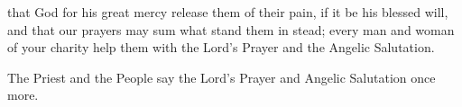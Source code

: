 that God for his great mercy release them of their pain, if it be his blessed will, and that our prayers may sum what stand them in stead; every man and woman of your charity help them with the Lord's Prayer and the Angelic Salutation.
\begin{rubric}
    The Priest and the People say the Lord's Prayer and Angelic Salutation once more.
\end{rubric}

